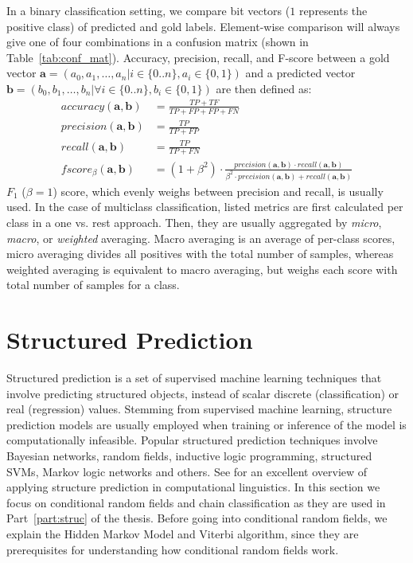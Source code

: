 In a binary classification setting, we compare bit vectors ($1$ represents the
positive class) of predicted and gold labels. Element-wise comparison will
always give one of four combinations in a confusion matrix (shown in
Table~\ref{tab:conf_mat}). Accuracy, precision, recall, and F-score between 
a gold vector $\mathbf{a} = (a_0, a_1, \dots, a_n | i \in \{0..n\},  a_i \in \{0, 1\})$ 
and a predicted vector 
$\mathbf{b} = (b_0, b_1, \dots, b_n | \forall i \in \{0..n\}, b_i \in \{0, 1\})$
are then defined as:
\begin{align*}
	accuracy(\mathbf{a, b}) &= \frac{TP + TF}{TP + FP + FP + FN} \\
	precision(\mathbf{a, b}) &= \frac{TP}{TP + FP} \\
	recall(\mathbf{a, b}) &= \frac{TP}{TP + FN} \\
	fscore_{\beta}(\mathbf{a, b}) &= (1 + \beta^2) 
	\cdot \frac{precision(\mathbf{a, b}) \cdot recall(\mathbf{a, b})}
	{\beta^2 \cdot precision(\mathbf{a, b}) + recall(\mathbf{a, b})}
\end{align*}
$F_1$ ($\beta = 1$) score, which evenly weighs between 
precision and recall, is usually used.
In the case of multiclass classification, listed metrics are first calculated 
per class in a one vs. rest approach. Then, they are usually 
aggregated by
\textit{micro}, \textit{macro}, or \textit{weighted} averaging. Macro
averaging is an average of per-class scores, micro
averaging divides all positives with the total number of 
samples, whereas weighted averaging is equivalent to macro averaging,
but weighs each score with total number of samples for a class. 

\section{Structured Prediction}
\label{sec:struc_machine_learning}

Structured prediction is a set of supervised machine learning techniques that
involve predicting structured objects, instead of scalar discrete
(classification) or real (regression) values.  Stemming from supervised machine
learning, structure prediction models are usually employed when training or
inference of the model is computationally infeasible.  Popular structured
prediction techniques involve Bayesian networks, random fields, inductive logic
programming, structured SVMs, Markov logic networks and others.  See
\citep{smith2011linguistic} for an excellent overview of applying structure
prediction in computational linguistics.  In this section we focus on
conditional random fields and chain classification as they are used in
Part~\ref{part:struc} of the thesis. Before going into  conditional random
fields, we explain the Hidden Markov Model and Viterbi algorithm, since they are
prerequisites for understanding how conditional random fields work.

